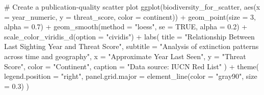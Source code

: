 \documentclass[
  letterpaper,
]{book}
\newenvironment{Shaded}{\begin{snugshade}}{\end{snugshade}}
\newcommand{\AttributeTok}[1]{\textcolor[rgb]{0.40,0.45,0.13}{#1}}
\newcommand{\CommentTok}[1]{\textcolor[rgb]{0.37,0.37,0.37}{#1}}
\newcommand{\ConstantTok}[1]{\textcolor[rgb]{0.56,0.35,0.01}{#1}}
\newcommand{\DecValTok}[1]{\textcolor[rgb]{0.68,0.00,0.00}{#1}}
\newcommand{\FloatTok}[1]{\textcolor[rgb]{0.68,0.00,0.00}{#1}}
\newcommand{\FunctionTok}[1]{\textcolor[rgb]{0.28,0.35,0.67}{#1}}
\newcommand{\NormalTok}[1]{\textcolor[rgb]{0.00,0.23,0.31}{#1}}
\newcommand{\SpecialCharTok}[1]{\textcolor[rgb]{0.37,0.37,0.37}{#1}}
\newcommand{\StringTok}[1]{\textcolor[rgb]{0.13,0.47,0.30}{#1}}
\begin{document}
\begin{Shaded}
\begin{Highlighting}[]
\CommentTok{\# Create a publication{-}quality scatter plot}
\FunctionTok{ggplot}\NormalTok{(biodiversity\_for\_scatter, }\FunctionTok{aes}\NormalTok{(}\AttributeTok{x =}\NormalTok{ year\_numeric, }\AttributeTok{y =}\NormalTok{ threat\_score, }\AttributeTok{color =}\NormalTok{ continent)) }\SpecialCharTok{+}
  \FunctionTok{geom\_point}\NormalTok{(}\AttributeTok{size =} \DecValTok{3}\NormalTok{, }\AttributeTok{alpha =} \FloatTok{0.7}\NormalTok{) }\SpecialCharTok{+}
  \FunctionTok{geom\_smooth}\NormalTok{(}\AttributeTok{method =} \StringTok{"loess"}\NormalTok{, }\AttributeTok{se =} \ConstantTok{TRUE}\NormalTok{, }\AttributeTok{alpha =} \FloatTok{0.2}\NormalTok{) }\SpecialCharTok{+}
  \FunctionTok{scale\_color\_viridis\_d}\NormalTok{(}\AttributeTok{option =} \StringTok{"cividis"}\NormalTok{) }\SpecialCharTok{+}
  \FunctionTok{labs}\NormalTok{(}
    \AttributeTok{title =} \StringTok{"Relationship Between Last Sighting Year and Threat Score"}\NormalTok{,}
    \AttributeTok{subtitle =} \StringTok{"Analysis of extinction patterns across time and geography"}\NormalTok{,}
    \AttributeTok{x =} \StringTok{"Approximate Year Last Seen"}\NormalTok{,}
    \AttributeTok{y =} \StringTok{"Threat Score"}\NormalTok{,}
    \AttributeTok{color =} \StringTok{"Continent"}\NormalTok{,}
    \AttributeTok{caption =} \StringTok{"Data source: IUCN Red List"}
\NormalTok{  ) }\SpecialCharTok{+}
  \FunctionTok{theme}\NormalTok{(}
    \AttributeTok{legend.position =} \StringTok{"right"}\NormalTok{,}
    \AttributeTok{panel.grid.major =} \FunctionTok{element\_line}\NormalTok{(}\AttributeTok{color =} \StringTok{"gray90"}\NormalTok{, }\AttributeTok{size =} \FloatTok{0.3}\NormalTok{)}
\NormalTok{  )}
\end{Highlighting}
\end{Shaded}
\end{document}
